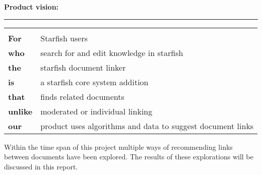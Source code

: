 \begin{shaded}
\textbf{{\large Product vision:}} \vspace{0.4\baselineskip} \hrule
 	\begin{tabular}{ll}
 		& \\
 		{\bf For} & Starfish users \\
 		{\bf who} & search for and edit knowledge in starfish\\
 		{\bf the} & starfish document linker \\
 		{\bf is} & a starfish core system addition\\
 		{\bf that} & finds related documents\\
 		{\bf unlike} & moderated or individual linking\\
 		{\bf our} & product uses algorithms and data to suggest document links 
	\end{tabular}
\end{shaded}


Within the time span of this project multiple ways of recommending links between documents have been explored. The results of these explorations will be discussed in this report. 